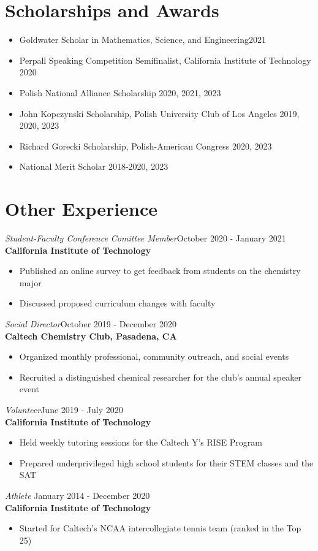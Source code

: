 \documentclass[margin,line]{resume}
\begin{document}
\begin{resume}
\section{\mysidestyle Scholarships and Awards}
\begin{itemize}
    \item  \textnormal{Goldwater Scholar in Mathematics, Science, and Engineering}\hfill 2021
    \item \textnormal{Perpall Speaking Competition} Semifinalist, California Institute of Technology \hfill 2020
    \item \textnormal{Polish National Alliance Scholarship} \hfill 2020, 2021, 2023
    \item \textnormal{John Kopczynski Scholarship}, Polish University Club of Los Angeles \hfill 2019, 2020, 2023
    \item \textnormal{Richard Gorecki Scholarship}, Polish-American Congress \hfill 2020, 2023
    \item \textnormal{National Merit Scholar} \hfill 2018-2020, 2023
\end{itemize}

\section{\mysidestyle Other Experience}
{\sl Student-Faculty Conference Comittee Member}\hfill October 2020 - January 2021\\
\textbf{California Institute of Technology}
\begin{itemize}
\item Published an online survey to get feedback from students on the chemistry major
\item Discussed proposed curriculum changes with faculty
\end{itemize}
{\sl Social Director}\hfill October 2019 - December 2020\\
\textbf{Caltech Chemistry Club, Pasadena, CA}
\begin{itemize}
\item Organized monthly professional, community outreach, and social events
\item Recruited a distinguished chemical researcher for the club's annual speaker event
\end{itemize}
\newpage
{\sl Volunteer}\hfill June 2019 - July 2020\\
\textbf{California Institute of Technology}
\begin{itemize}
\item Held weekly tutoring sessions for the Caltech Y's RISE Program
\item Prepared underprivileged high school students for their STEM classes and the SAT
\end{itemize}
{\sl Athlete} \hfill January 2014 - December 2020\\
\textbf{California Institute of Technology}
\begin{itemize}
\item Started for Caltech's NCAA intercollegiate tennis team (ranked in the Top 25)
\end{itemize}


\end{resume}
\end{document}
